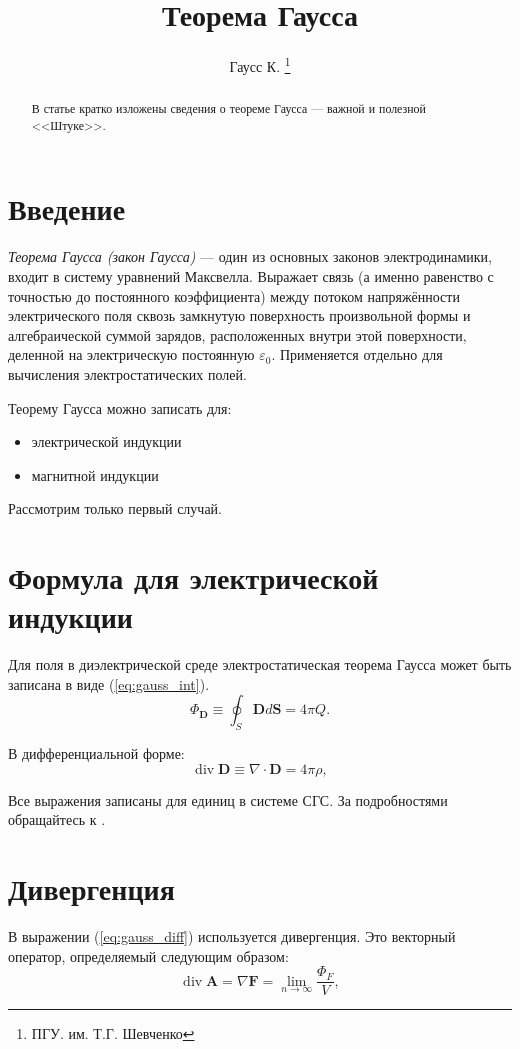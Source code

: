 \documentclass[a4paper,10pt]{article}
\begin{document}
\newcommand{\vect}[1]{\boldsymbol{\mathbf{#1}}}
\title{Теорема Гаусса}
\author{Гаусс К. \footnote{ПГУ. им. Т.Г. Шевченко}}
\maketitle
\begin{abstract}
В статье кратко изложены сведения о теореме Гаусса --- важной и полезной <<Штуке>>.
\end{abstract}
\section{Введение}
\emph{Теорема Гаусса (закон Гаусса)} --- один из основных законов электродинамики, входит в систему уравнений Максвелла. Выражает связь (а именно равенство с точностью до постоянного коэффициента) между потоком напряжённости электрического поля сквозь замкнутую поверхность произвольной формы и алгебраической суммой зарядов, расположенных внутри этой поверхности, деленной на электрическую постоянную $\varepsilon_0$. Применяется отдельно для вычисления электростатических полей.

Теорему Гаусса можно записать для:
\begin{itemize}
\item{электрической индукции}
\item{магнитной индукции}
\end{itemize}

Рассмотрим только первый случай.

\section{Формула для электрической индукции}
Для поля в диэлектрической среде электростатическая теорема Гаусса может быть записана в виде (\ref{eq:gauss_int}).
\begin{equation} \label{eq:gauss_int}
\Phi_{\vect{D}}\equiv\oint_S\vect{D}d\vect{S}=4\pi Q.
\end{equation}

В дифференциальной форме:
\begin{equation} \label{eq:gauss_diff}
\operatorname{div}\vect{D}\equiv\nabla\cdot\vect{D}=4\pi\rho,
\end{equation}

Все выражения записаны для единиц в системе СГС. За подробностями обращайтесь к \cite{LL}.

\section{Дивергенция}
В выражении (\ref{eq:gauss_diff}) используется дивергенция. Это векторный оператор, определяемый следующим образом:
\begin{equation} \label{eq:div_vec}
\operatorname{div}\vect{A}=\nabla\vect{F}=\lim_{n \to \infty}\frac{\Phi_F}{V},
\end{equation}
\end{document}
